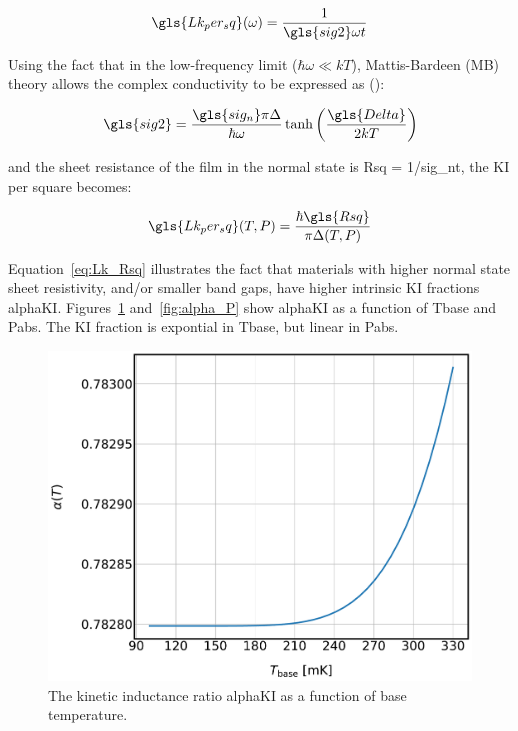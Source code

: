 \begin{equation}
  \gls{Lk_per_sq}(\omega) = \frac{1}{\gls{sig2}\omega t}
\end{equation}

Using the fact that in the low-frequency limit ($\hbar\omega \ll kT$), Mattis-Bardeen (MB) theory allows the complex conductivity to be expressed as (\citet{mauskopf2018transition,annunziata2010tunable}):

\begin{equation}
  \gls{sig2} = \frac{\gls{sig_n}\pi\Delta}{\hbar\omega}\tanh \left(\frac{\gls{Delta}}{2kT}\right)
\end{equation}

and the sheet resistance of the film in the normal state is \gls{Rsq} = 1/\gls{sig_n}t, the KI per square becomes:

\begin{equation} \label{eq:Lk_Rsq}
  \gls{Lk_per_sq}(T,P) = \frac{\hbar\gls{Rsq}}{\pi\Delta(T,P)}
\end{equation}

Equation~\ref{eq:Lk_Rsq} illustrates the fact that materials with higher normal state sheet resistivity, and/or smaller band gaps, have higher intrinsic KI fractions \gls{alphaKI}. Figures~\ref{fig:alpha_T} and~\ref{fig:alpha_P} show \gls{alphaKI} as a function of \gls{Tbase} and \gls{Pabs}. The KI fraction is expontial in \gls{Tbase}, but linear in \gls{Pabs}.

\begin{figure}[!htbp]
\centering
\includegraphics[width=\textwidth]{figures/kid_model/alpha_T}
\caption[ as a function of base temperature.]{The kinetic inductance ratio \gls{alphaKI} as a function of base temperature.}
\label{fig:alpha_T}
\end{figure}

